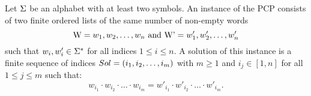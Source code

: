
\begin{definition}\label{def:pcp}
Let $\Sigma$ be an alphabet with at least two symbols. An instance \pcpinstance{} of the PCP consists of two finite ordered lists of the same number of non-empty words $$\text{W}= {w_{1}, w_{2},\ldots , w_{n}}\text{ and }\text{\text{W}'}= {w'_{1}, w'_{2}, \ldots , w'_{n}}$$ such that $w_{i}, w'_{i} \in \Sigma^{*}$ for all indices $1 \leq i \leq n$. 
A solution of this instance is a finite sequence of indices $Sol = ( i_{1}, i_{2}, \dots, i_{m} )$ with $m \geq 1$ and $i_{j} \in [1,n]$ for all $1 \leq j \leq m$ such that:
$$w_{i_{1}} \cdot w_{i_{2}} \cdot \ldots  \cdot w_{i_{m}} = w'_{i_{1}} \cdot w'_{i_{2}} \cdot \ldots  \cdot w'_{i_{m}} .$$
\end{definition} 


